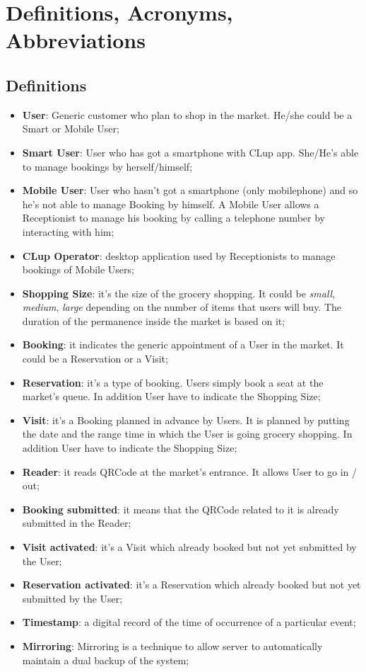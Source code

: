 \bigskip
\section{Definitions, Acronyms, Abbreviations}
\subsection{Definitions}
\label{info}
\begin{itemize}
\item \textbf{User}: Generic customer who plan to shop in the market. He/she could be a Smart or Mobile User;
\item \textbf{Smart User}: User who has got a smartphone with CLup app. She/He's able to manage bookings by herself/himself;
\item \textbf{Mobile User}: User who hasn't got a smartphone (only mobilephone) and so he's not able to manage Booking by himself. A Mobile User allows a Receptionist to manage his booking by calling a telephone number by interacting with him;
\item \textbf{CLup Operator}: desktop application used by Receptionists to manage bookings of Mobile Users;
\item \textbf{Shopping Size}: it's the size of the grocery shopping. It could be \textit{small}, \textit{medium}, \textit{large} depending on the number of items that users will buy. The duration of the permanence inside the market is based on it; 
\item \textbf{Booking}: it indicates the generic appointment of a User in the market. It could be a Reservation or a Visit;
\item \textbf{Reservation}: it's a type of booking. Users simply book a seat at the market's queue. In addition User have to indicate the Shopping Size; 
\item \textbf{Visit}: it's a Booking planned in advance by Users. It is planned by putting the date and the range time in which the User is going grocery shopping. In addition User have to indicate the Shopping Size; 
\item \textbf{Reader}: it reads QRCode at the market's entrance. It allows User to go in / out;
\item \textbf{Booking submitted}: it means that the QRCode related to it is already submitted in the Reader;
\item \textbf{Visit activated}: it's a Visit which already booked but not yet submitted by the User;
\item \textbf{Reservation activated}: it's a Reservation which already booked but not yet submitted by the User;
\item \textbf{Timestamp}: a digital record of the time of occurrence of a particular event;
\item\textbf{Mirroring}: Mirroring is a technique to allow server to automatically maintain a dual backup of the system;
\end{itemize}

